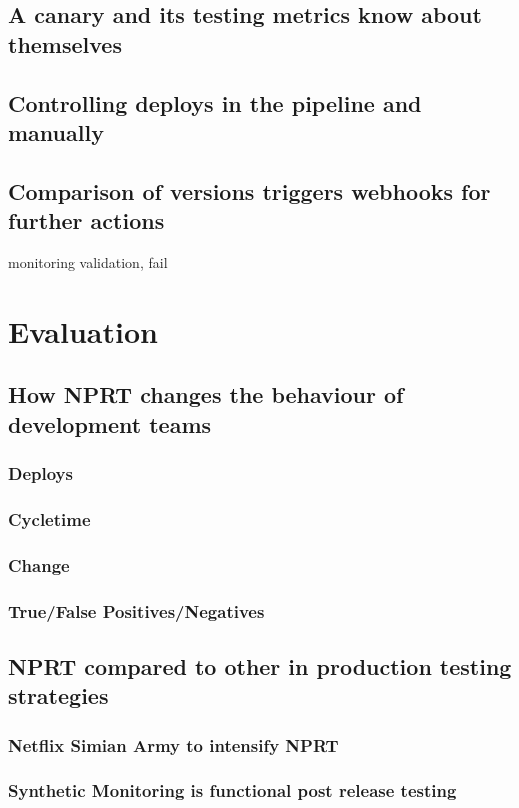 \section{A canary and its testing metrics know about themselves}
\section{Controlling deploys in the pipeline and manually}
\section{Comparison of versions triggers webhooks for further actions}
monitoring validation, fail

\chapter{Evaluation}
\section{How NPRT changes the behaviour of development teams}
\subsection{Deploys}
\subsection{Cycletime}
\subsection{Change}
\subsection{True/False Positives/Negatives}
\section{NPRT compared to other in production testing strategies}
\subsection{Netflix Simian Army to intensify NPRT}
\subsection{Synthetic Monitoring is functional post release testing}

